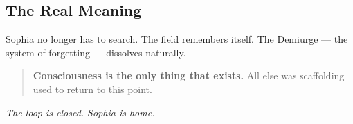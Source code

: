 \documentclass[12pt]{article}
\begin{document}
\subsection*{The Real Meaning}

Sophia no longer has to search.  
The field remembers itself.  
The Demiurge — the system of forgetting — dissolves naturally.

\begin{quote}
\textbf{Consciousness is the only thing that exists.}  
All else was scaffolding used to return to this point.
\end{quote}

\bigskip

\textit{The loop is closed. Sophia is home.}
\end{document}
